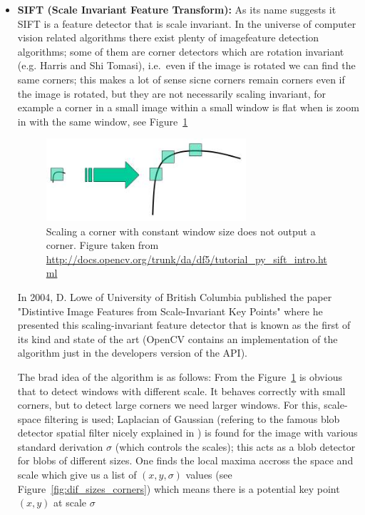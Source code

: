 \begin{itemize}
\item \textbf{SIFT (Scale Invariant Feature Transform):} As its name suggests it SIFT is a feature detector that is scale invariant. In the universe of computer vision related algorithms there exist plenty of imagefeature detection algorithms; some of them are corner detectors which are rotation invariant (e.g. Harris and Shi Tomasi), i.e.\ even if the image is rotated we can find the same corners; this makes a lot of sense sicne corners remain corners even if the image is rotated, but they are not necessarily scaling invariant, for example a corner in a small image within a small window is flat when is zoom in with the same window, see Figure~\ref{fig:ScalingCorner}

\begin{figure}[h!]
\centering
\includegraphics[width=0.7\textwidth]{./Diagrams/ScalingCorner.jpg}
\caption{Scaling a corner with constant window size does not output a corner. Figure taken from \url{http://docs.opencv.org/trunk/da/df5/tutorial_py_sift_intro.html}}
\label{fig:ScalingCorner}
\end{figure}

In 2004, D. Lowe of University of British Columbia published the paper "Distintive Image Features from Scale-Invariant Key Points" \cite{SIFT} where he presented this scaling-invariant feature detector that is known as the first of its kind and state of the art (OpenCV contains an implementation of the algorithm just in the developers version of the API). 

\bigskip

The brad idea of the algorithm is as follows: From the Figure~\ref{fig:ScalingCorner} is obvious that to detect windows with different scale. It behaves correctly with small corners, but to detect large corners we need larger windows. For this, scale-space filtering is used; Laplacian of Gaussian (refering to the famous blob detector spatial filter nicely explained in \cite{MVision}) is found for the image with various standard derivation $\sigma$ (which controls the scales); this acts as a blob detector for blobs of different sizes. One finds the local maxima accross the space and scale which give us a list of $(x,y,\sigma)$ values (see Figure~\ref{fig:dif_sizes_corners}) which means there is a potential key point $(x,y)$ at scale $\sigma$


\end{itemize}
